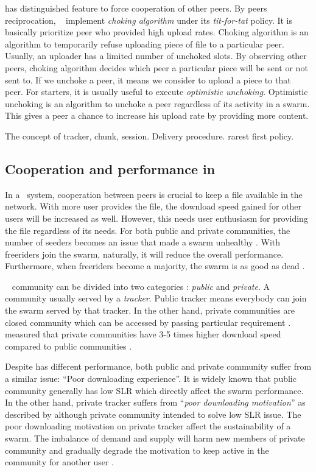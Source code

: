 \bt has distinguished feature to force cooperation of other peers. By peers reciprocation, \bt~ implement \textit{choking algorithm} under its \textit{tit-for-tat} policy. It is basically prioritize peer who provided high upload rates. Choking algorithm is an algorithm to temporarily refuse uploading piece of file to a particular peer. Usually, an uploader has a limited number of unchoked slots. By observing other peers, choking algorithm decides which peer a particular piece will be sent or not sent to. If we unchoke a peer, it means we consider to upload a piece to that peer. For starters, it is usually useful to execute \textit{optimistic unchoking}. Optimistic unchoking is an algorithm to unchoke a peer regardless of its activity in a swarm. This gives a peer a chance to increase his upload rate by providing more content.

The concept of tracker, chunk, session. Delivery procedure. rarest first policy. 

\subsection{Cooperation and performance in \bt}

In a \bt~system, cooperation between peers is crucial to keep a file available in the network. With more user provides the file, the download speed gained for other users will be increased as well. However, this needs user enthusiasm for providing the file regardless of its needs. For both public and private communities, the number of seeders becomes an issue that made a swarm unhealthy \cite{2010:pubpriv:meulpolder, 2014:sustainabilitytorrent:chen}. With freeriders join the swarm, naturally, it will reduce the overall performance. Furthermore, when freeriders become a majority, the swarm is as good as dead \cite{2000:freeridegnutella:adar}. 

\bt~ community can be divided into two categories : \textit{public} and \textit{private}. A community usually served by a \textit{tracker}. Public tracker means everybody can join the swarm served by that tracker. In the other hand, private communities are closed community which can be accessed by passing particular requirement \cite{2010:pubpriv:meulpolder, 2014:sustainabilitytorrent:chen}. \citeauthor{2010:pubpriv:meulpolder} measured that private communities have 3-5 times higher download speed compared to public communities \cite{2010:pubpriv:meulpolder}.

Despite has different performance, both public and private community suffer from a similar issue: ``Poor downloading experience''. It is widely known that public community generally has low SLR which directly affect the swarm performance. In the other hand, private tracker suffers from ``\textit{poor downloading motivation}'' as described by \citeauthor{2014:sustainabilitytorrent:chen}\cite{2014:sustainabilitytorrent:chen} although private community intended to solve low SLR issue. The poor downloading motivation on private tracker affect the sustainability of a swarm. The imbalance of demand and supply will harm new members of private community and gradually degrade the motivation to keep active in the community for another user \cite{2014:sustainabilitytorrent:chen}.

